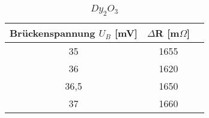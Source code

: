 \begin{table}[h]
	\begin{center}
		\begin{tabular}{ccc}
			Brückenspannung $U_B$ [mV] & $\Delta$R [m$\Omega$]\\ \hline
			35	&1655\\
			36	&1620\\
			36,5&1650\\
			37	&1660\\
		\end{tabular}
		\caption{$Dy_2O_3$}
		\label{tab4}
	\end{center}
\end{table}
